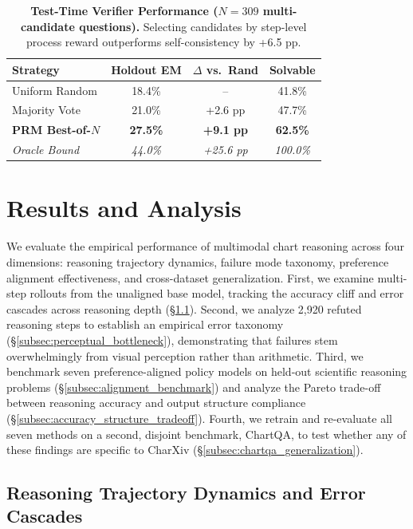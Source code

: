 \documentclass[11pt]{article}
\begin{document}
\begin{table}[t]
\centering
\footnotesize
\setlength{\tabcolsep}{2.6pt}
\begin{tabular}{lccc}
\toprule
\textbf{Strategy} & \textbf{Holdout EM} & \textbf{$\Delta$ vs.\ Rand} & \textbf{Solvable} \\
\midrule
Uniform Random & 18.4\% & -- & 41.8\% \\
Majority Vote & 21.0\% & +2.6 pp & 47.7\% \\
\textbf{PRM Best-of-$N$} & \textbf{27.5\%} & \textbf{+9.1 pp} & \textbf{62.5\%} \\
\midrule
\textit{Oracle Bound} & \textit{44.0\%} & \textit{+25.6 pp} & \textit{100.0\%} \\
\bottomrule
\end{tabular}
\caption{\textbf{Test-Time Verifier Performance ($N=309$ multi-candidate questions).} Selecting candidates by step-level process reward outperforms self-consistency by +6.5 pp.}
\label{tab:best_of_n}
\end{table}

\section{Results and Analysis}
\label{sec:results_analysis}

We evaluate the empirical performance of multimodal chart reasoning across four dimensions: reasoning trajectory dynamics, failure mode taxonomy, preference alignment effectiveness, and cross-dataset generalization. First, we examine multi-step rollouts from the unaligned base model, tracking the accuracy cliff and error cascades across reasoning depth (\S\ref{subsec:trajectory_dynamics}). Second, we analyze 2,920 refuted reasoning steps to establish an empirical error taxonomy (\S\ref{subsec:perceptual_bottleneck}), demonstrating that failures stem overwhelmingly from visual perception rather than arithmetic. Third, we benchmark seven preference-aligned policy models on held-out scientific reasoning problems (\S\ref{subsec:alignment_benchmark}) and analyze the Pareto trade-off between reasoning accuracy and output structure compliance (\S\ref{subsec:accuracy_structure_tradeoff}). Fourth, we retrain and re-evaluate all seven methods on a second, disjoint benchmark, ChartQA, to test whether any of these findings are specific to CharXiv (\S\ref{subsec:chartqa_generalization}).

\subsection{Reasoning Trajectory Dynamics and Error Cascades}
\label{subsec:trajectory_dynamics}
\end{document}
